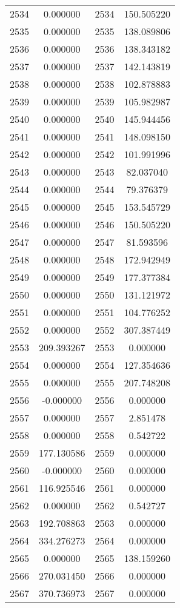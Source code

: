 \documentclass[12pt]{article}
\begin{document}
\begin{longtable}{@{}cccc@{}}
2534 & 0.000000 & 2534 & 150.505220 \\
2535 & 0.000000 & 2535 & 138.089806 \\
2536 & 0.000000 & 2536 & 138.343182 \\
2537 & 0.000000 & 2537 & 142.143819 \\
2538 & 0.000000 & 2538 & 102.878883 \\
2539 & 0.000000 & 2539 & 105.982987 \\
2540 & 0.000000 & 2540 & 145.944456 \\
2541 & 0.000000 & 2541 & 148.098150 \\
2542 & 0.000000 & 2542 & 101.991996 \\
2543 & 0.000000 & 2543 & 82.037040 \\
2544 & 0.000000 & 2544 & 79.376379 \\
2545 & 0.000000 & 2545 & 153.545729 \\
2546 & 0.000000 & 2546 & 150.505220 \\
2547 & 0.000000 & 2547 & 81.593596 \\
2548 & 0.000000 & 2548 & 172.942949 \\
2549 & 0.000000 & 2549 & 177.377384 \\
2550 & 0.000000 & 2550 & 131.121972 \\
2551 & 0.000000 & 2551 & 104.776252 \\
2552 & 0.000000 & 2552 & 307.387449 \\
2553 & 209.393267 & 2553 & 0.000000 \\
2554 & 0.000000 & 2554 & 127.354636 \\
2555 & 0.000000 & 2555 & 207.748208 \\
2556 & -0.000000 & 2556 & 0.000000 \\
2557 & 0.000000 & 2557 & 2.851478 \\
2558 & 0.000000 & 2558 & 0.542722 \\
2559 & 177.130586 & 2559 & 0.000000 \\
2560 & -0.000000 & 2560 & 0.000000 \\
2561 & 116.925546 & 2561 & 0.000000 \\
2562 & 0.000000 & 2562 & 0.542727 \\
2563 & 192.708863 & 2563 & 0.000000 \\
2564 & 334.276273 & 2564 & 0.000000 \\
2565 & 0.000000 & 2565 & 138.159260 \\
2566 & 270.031450 & 2566 & 0.000000 \\
2567 & 370.736973 & 2567 & 0.000000 \\

\end{longtable}
\end{document}
